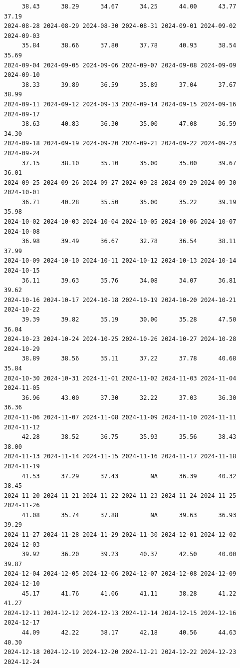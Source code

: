 \documentclass[
  letterpaper,
  DIV=11,
  numbers=noendperiod]{scrartcl}
\begin{document}
\begin{verbatim}
     38.43      38.29      34.67      34.25      44.00      43.77      37.19 
2024-08-28 2024-08-29 2024-08-30 2024-08-31 2024-09-01 2024-09-02 2024-09-03 
     35.84      38.66      37.80      37.78      40.93      38.54      35.69 
2024-09-04 2024-09-05 2024-09-06 2024-09-07 2024-09-08 2024-09-09 2024-09-10 
     38.33      39.89      36.59      35.89      37.04      37.67      38.99 
2024-09-11 2024-09-12 2024-09-13 2024-09-14 2024-09-15 2024-09-16 2024-09-17 
     38.63      40.83      36.30      35.00      47.08      36.59      34.30 
2024-09-18 2024-09-19 2024-09-20 2024-09-21 2024-09-22 2024-09-23 2024-09-24 
     37.15      38.10      35.10      35.00      35.00      39.67      36.01 
2024-09-25 2024-09-26 2024-09-27 2024-09-28 2024-09-29 2024-09-30 2024-10-01 
     36.71      40.28      35.50      35.00      35.22      39.19      35.98 
2024-10-02 2024-10-03 2024-10-04 2024-10-05 2024-10-06 2024-10-07 2024-10-08 
     36.98      39.49      36.67      32.78      36.54      38.11      37.99 
2024-10-09 2024-10-10 2024-10-11 2024-10-12 2024-10-13 2024-10-14 2024-10-15 
     36.11      39.63      35.76      34.08      34.07      36.81      39.62 
2024-10-16 2024-10-17 2024-10-18 2024-10-19 2024-10-20 2024-10-21 2024-10-22 
     39.39      39.82      35.19      30.00      35.28      47.50      36.04 
2024-10-23 2024-10-24 2024-10-25 2024-10-26 2024-10-27 2024-10-28 2024-10-29 
     38.89      38.56      35.11      37.22      37.78      40.68      35.84 
2024-10-30 2024-10-31 2024-11-01 2024-11-02 2024-11-03 2024-11-04 2024-11-05 
     36.96      43.00      37.30      32.22      37.03      36.30      36.36 
2024-11-06 2024-11-07 2024-11-08 2024-11-09 2024-11-10 2024-11-11 2024-11-12 
     42.28      38.52      36.75      35.93      35.56      38.43      38.00 
2024-11-13 2024-11-14 2024-11-15 2024-11-16 2024-11-17 2024-11-18 2024-11-19 
     41.53      37.29      37.43         NA      36.39      40.32      38.45 
2024-11-20 2024-11-21 2024-11-22 2024-11-23 2024-11-24 2024-11-25 2024-11-26 
     41.08      35.74      37.88         NA      39.63      36.93      39.29 
2024-11-27 2024-11-28 2024-11-29 2024-11-30 2024-12-01 2024-12-02 2024-12-03 
     39.92      36.20      39.23      40.37      42.50      40.00      39.87 
2024-12-04 2024-12-05 2024-12-06 2024-12-07 2024-12-08 2024-12-09 2024-12-10 
     45.17      41.76      41.06      41.11      38.28      41.22      41.27 
2024-12-11 2024-12-12 2024-12-13 2024-12-14 2024-12-15 2024-12-16 2024-12-17 
     44.09      42.22      38.17      42.18      40.56      44.63      40.30 
2024-12-18 2024-12-19 2024-12-20 2024-12-21 2024-12-22 2024-12-23 2024-12-24 

\end{verbatim}
\end{document}
